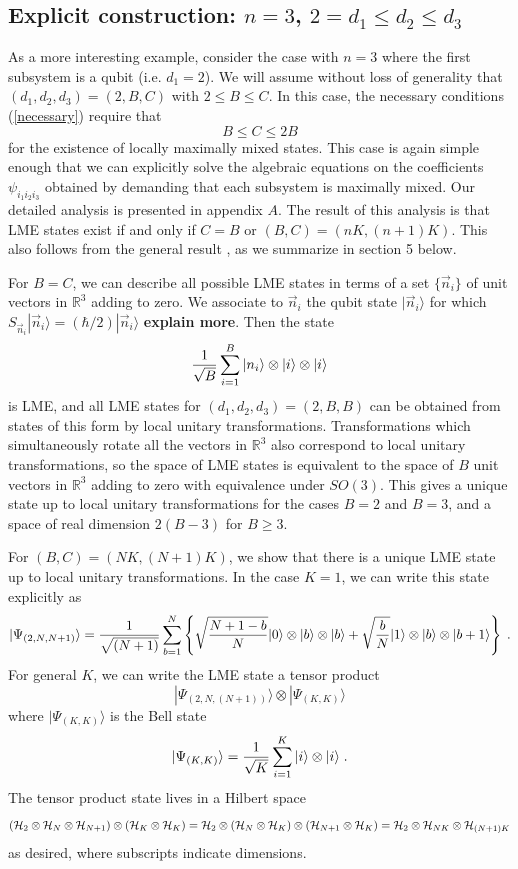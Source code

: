\documentclass[12pt]{article}
\theoremstyle{definition}
\newcommand{\be}{\begin{equation}}
\newcommand{\ee}{\end{equation}}
\begin{document}
\subsection{Explicit construction: $n=3$, $2 = d_1 \le d_2 \le d_3$}\label{sec:Explicit23}

As a more interesting example, consider the case with $n=3$ where the
first subsystem is a qubit (i.e. $d_1 = 2$). We will assume without
loss of generality that $(d_1, d_2, d_3) = (2,B,C)$ with $2 \le B \le
C$. In this case, the necessary conditions (\ref{necessary}) require
that \be B \le C \le 2 B \ee for the existence of locally maximally
mixed states. This case is again simple enough that we can explicitly
solve the algebraic equations on the coefficients $\psi_{i_1 i_2 i_3}$
obtained by demanding that each subsystem is maximally mixed. Our
detailed analysis is presented in appendix $A$. The result of this
analysis is that LME states exist if and only if $C=B$ or $(B,C) =
(nK,(n+1)K)$. This also follows from the general result
\cite{mathpaper}, as we summarize in section 5 below.


For $B=C$, we can describe all possible LME states in terms of a set
$\{\vec{n}_i \}$ of unit vectors in $\mathbb{R}^3$ adding to zero. We
associate to $\vec{n}_i$ the qubit state $|\vec{n}_i \rangle$ for
which $S_{\vec{n}_i} |\vec{n}_i \rangle = (\hbar/2)|\vec{n}_i \rangle$
{\bf explain more}. Then the state \be {1 \over \sqrt{B}} \sum_{i=1}^B
|n_{i} \rangle \otimes |i \rangle \otimes |i \rangle \ee is LME, and
all LME states for $(d_1,d_2,d_3) = (2,B,B)$ can be obtained from
states of this form by local unitary transformations. Transformations
which simultaneously rotate all the vectors in $\mathbb{R}^3$ also
correspond to local unitary transformations, so the space of LME
states is equivalent to the space of $B$ unit vectors in
$\mathbb{R}^3$ adding to zero with equivalence under $SO(3)$. This
gives a unique state up to local unitary transformations for the cases
$B=2$ and $B=3$, and a space of real dimension $2(B-3)$ for $B \ge 3$.

For $(B,C)=(NK,(N+1)K)$, we show that there is a unique LME state up to local unitary transformations. In the case $K=1$, we can write this state explicitly as
\be
|\Psi_{(2,N,N+1)} \rangle = {1 \over \sqrt{(N+1)}} \sum_{b=1}^N \left\{ \sqrt{N + 1 - b \over N} |0 \rangle \otimes  |b  \rangle \otimes |b \rangle + \sqrt{b \over N}  |1 \rangle \otimes|b \rangle \otimes |b+1 \rangle \right\} \; .
\ee
For general $K$, we can write the LME state a tensor product
\be
|\Psi_{(2,N,(N+1))} \rangle \otimes |\Psi_{(K,K)} \rangle
\ee
where $|\Psi_{(K,K)} \rangle$ is the Bell state
\be
|\Psi_{(K,K)} \rangle = {1 \over \sqrt{K}}  \sum_{i=1}^K  |i \rangle \otimes  |i \rangle \; .
\ee
The tensor product state lives in a Hilbert space
\be
({\cal H}_2 \otimes {\cal H}_N \otimes {\cal H}_{N+1}) \otimes ({\cal H}_K \otimes {\cal H}_K) = {\cal H}_2 \otimes ({\cal H}_N \otimes {\cal H}_K) \otimes ({\cal H}_{N+1} \otimes {\cal H}_K) = {\cal H}_2 \otimes {\cal H}_{NK} \otimes {\cal H}_{(N+1)K}
\ee
as desired, where subscripts indicate dimensions.
\end{document}
